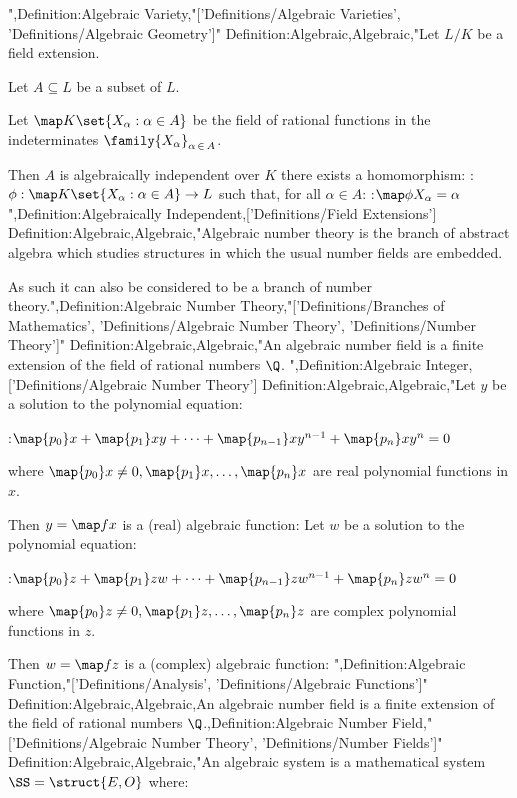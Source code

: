 ",Definition:Algebraic Variety,"['Definitions/Algebraic Varieties', 'Definitions/Algebraic Geometry']"
Definition:Algebraic,Algebraic,"Let $L / K$ be a field extension.

Let $A \subseteq L$ be a subset of $L$.

Let $\map K {\set {X_\alpha: \alpha \in A} }$ be the field of rational functions in the indeterminates $\family {X_\alpha}_{\alpha \mathop \in A}$.


Then $A$ is algebraically independent over $K$  there exists a homomorphism:
:$\phi: \map K {\set {X_\alpha: \alpha \in A} } \to L$
such that, for all $\alpha \in A$:
:$\map \phi {X_\alpha} = \alpha$",Definition:Algebraically Independent,['Definitions/Field Extensions']
Definition:Algebraic,Algebraic,"Algebraic number theory is the branch of abstract algebra which studies structures in which the usual number fields are embedded.

As such it can also be considered to be a branch of number theory.",Definition:Algebraic Number Theory,"['Definitions/Branches of Mathematics', 'Definitions/Algebraic Number Theory', 'Definitions/Number Theory']"
Definition:Algebraic,Algebraic,"An algebraic number field is a finite extension of the field of rational numbers $\Q$.
",Definition:Algebraic Integer,['Definitions/Algebraic Number Theory']
Definition:Algebraic,Algebraic,"Let $y$ be a solution to the polynomial equation:

:$\map {p_0} x + \map {p_1} x y + \dotsb + \map {p_{n - 1} } x y^{n - 1} + \map {p_n} x y^n = 0$

where $\map {p_0} x \ne 0, \map {p_1} x, \dotsc, \map {p_n} x$ are real polynomial functions in $x$.


Then $y = \map f x$ is a (real) algebraic function:
Let $w$ be a solution to the polynomial equation:

:$\map {p_0} z + \map {p_1} z w + \dotsb + \map {p_{n - 1} } z w^{n - 1} + \map {p_n} z w^n = 0$

where $\map {p_0} z \ne 0, \map {p_1} z, \dotsc, \map {p_n} z$ are complex polynomial functions in $z$.


Then $w = \map f z$ is a (complex) algebraic function:
",Definition:Algebraic Function,"['Definitions/Analysis', 'Definitions/Algebraic Functions']"
Definition:Algebraic,Algebraic,An algebraic number field is a finite extension of the field of rational numbers $\Q$.,Definition:Algebraic Number Field,"['Definitions/Algebraic Number Theory', 'Definitions/Number Fields']"
Definition:Algebraic,Algebraic,"An algebraic system is a mathematical system $\SS = \struct {E, O}$ where:

